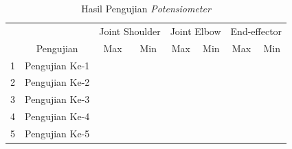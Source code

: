 \begin{table}[H]
	\centering
	\caption{Hasil Pengujian \textit{Potensiometer}}
	\label{tbl.potensiometer}
	\begin{tabular}{|c|c|c|c|c|c|c|c|}
		\hline
		\rowcolor[HTML]{9B9B9B} 
		\cellcolor[HTML]{9B9B9B}                     & \cellcolor[HTML]{9B9B9B}                            & \multicolumn{2}{c|}{\cellcolor[HTML]{9B9B9B}Joint Shoulder} & \multicolumn{2}{c|}{\cellcolor[HTML]{9B9B9B}Joint Elbow} & \multicolumn{2}{c|}{\cellcolor[HTML]{9B9B9B}End-effector} \\ \cline{3-8} 
		\rowcolor[HTML]{9B9B9B} 
		\multirow{-2}{*}{\cellcolor[HTML]{9B9B9B}No} & \multirow{-2}{*}{\cellcolor[HTML]{9B9B9B}Pengujian} & Max                          & Min                          & Max                         & Min                        & Max                         & Min                         \\ \hline
		1                                            & Pengujian Ke-1                                      &                              &                              &                             &                            &                             &                             \\ \hline
		2                                            & Pengujian Ke-2                                      &                              &                              &                             &                            &                             &                             \\ \hline
		3                                            & Pengujian Ke-3                                      &                              &                              &                             &                            &                             &                             \\ \hline
		4                                            & Pengujian Ke-4                                      &                              &                              &                             &                            &                             &                             \\ \hline
		5                                            & Pengujian Ke-5                                      &                              &                              &                             &                            &                             &                             \\ \hline
	\end{tabular}
\end{table} 

